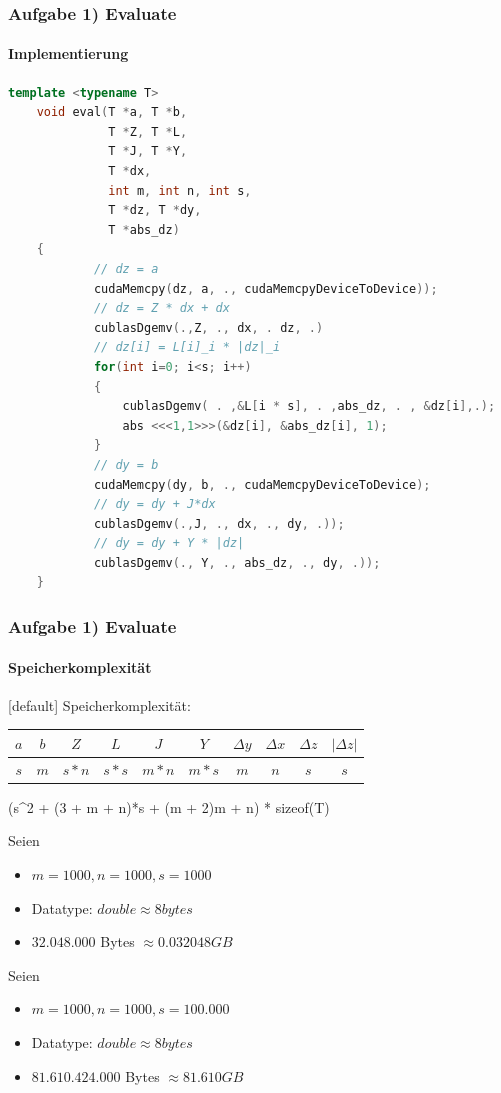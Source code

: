\begin{frame}[fragile]
	\frametitle{Aufgabe 1) Evaluate}
	\framesubtitle{Implementierung}
	\begin{lstlisting}[language=cpp]
	template <typename T>
	void eval(T *a, T *b, 
			  T *Z, T *L, 
			  T *J, T *Y,
			  T *dx,
			  int m, int n, int s,
			  T *dz, T *dy,
			  T *abs_dz)
	{
			// dz = a
			cudaMemcpy(dz, a, ., cudaMemcpyDeviceToDevice));
			// dz = Z * dx + dx
			cublasDgemv(.,Z, ., dx, . dz, .)
			// dz[i] = L[i]_i * |dz|_i
			for(int i=0; i<s; i++)
			{
				cublasDgemv( . ,&L[i * s], . ,abs_dz, . , &dz[i],.);
				abs <<<1,1>>>(&dz[i], &abs_dz[i], 1);
			}
			// dy = b
			cudaMemcpy(dy, b, ., cudaMemcpyDeviceToDevice);
			// dy = dy + J*dx
			cublasDgemv(.,J, ., dx, ., dy, .));
			// dy = dy + Y * |dz|
			cublasDgemv(., Y, ., abs_dz, ., dy, .));
	}
	\end{lstlisting}
\end{frame}
\begin{frame}
	\frametitle{Aufgabe 1) Evaluate}
	\framesubtitle{Speicherkomplexität}
	[default]
	Speicherkomplexität: \\
	\begin{center}
		\begin{tabular}{ c | c | c | c | c | c | c | c | c | c }
		$a$ & $b$ & $Z$ & $L$ & $J$ & $Y$ & $\Delta y$ & $\Delta x$ & $\Delta z$ & $|\Delta z|$\\
		\hline
		$s$ & $m$ & $s*n$ & $s*s$ & $m*n$ & $m*s$ & $m$ & $n$ & $s$& $s$\\
		\end{tabular}
	\end{center}
	\begin{flalign*}
		(s^2 + (3 + m + n)*s + (m + 2)m + n) * sizeof(T)
	\end{flalign*}
	\pause
	Seien 
	\begin{itemize}
		\item $m = 1000, n = 1000, s=1000$
		\item Datatype: $double \approx 8 bytes$
		\item $32.048.000$ Bytes $\approx 0.032048 GB$
	\end{itemize}
	\pause
	Seien 
	\begin{itemize}
		\item $m = 1000, n = 1000, s=100.000$
		\item Datatype: $double \approx 8 bytes$
		\item $81.610.424.000$ Bytes $\approx 81.610 GB$
		\end{itemize}
\end{frame}

